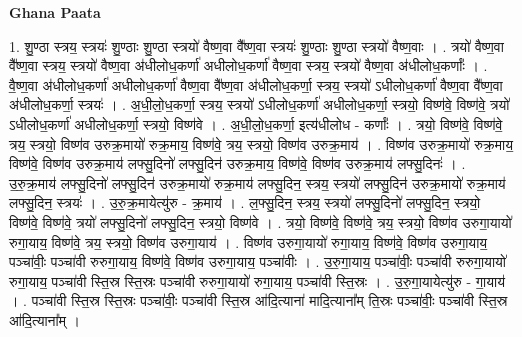 \documentclass[17pt]{extarticle}
\begin{document}
\textbf{Ghana Paata } \newline

1. शु॒ण्ठा स्त्रय॒ स्त्रयः॑ शु॒ण्ठाः शु॒ण्ठा स्त्रयो॑ वैष्ण॒वा वै᳚ष्ण॒वा स्त्रयः॑ शु॒ण्ठाः शु॒ण्ठा स्त्रयो॑ वैष्ण॒वाः । . त्रयो॑ वैष्ण॒वा वै᳚ष्ण॒वा स्त्रय॒ स्त्रयो॑ वैष्ण॒वा अ॑धीलोध॒कर्णा॑ अधीलोध॒कर्णा॑ वैष्ण॒वा स्त्रय॒ स्त्रयो॑ वैष्ण॒वा अ॑धीलोध॒कर्णाः᳚ । . वै॒ष्ण॒वा अ॑धीलोध॒कर्णा॑ अधीलोध॒कर्णा॑ वैष्ण॒वा वै᳚ष्ण॒वा अ॑धीलोध॒कर्णा॒ स्त्रय॒ स्त्रयो॑ ऽधीलोध॒कर्णा॑ वैष्ण॒वा वै᳚ष्ण॒वा अ॑धीलोध॒कर्णा॒ स्त्रयः॑ । . अ॒धी॒लो॒ध॒कर्णा॒ स्त्रय॒ स्त्रयो॑ ऽधीलोध॒कर्णा॑ अधीलोध॒कर्णा॒ स्त्रयो॒ विष्ण॑वे॒ विष्ण॑वे॒ त्रयो॑ ऽधीलोध॒कर्णा॑ अधीलोध॒कर्णा॒ स्त्रयो॒ विष्ण॑वे । . अ॒धी॒लो॒ध॒कर्णा॒ इत्य॑धीलोध - कर्णाः᳚ । . त्रयो॒ विष्ण॑वे॒ विष्ण॑वे॒ त्रय॒ स्त्रयो॒ विष्ण॑व उरुक्र॒मायो॑ रुक्र॒माय॒ विष्ण॑वे॒ त्रय॒ स्त्रयो॒ विष्ण॑व उरुक्र॒माय॑ । . विष्ण॑व उरुक्र॒मायो॑ रुक्र॒माय॒ विष्ण॑वे॒ विष्ण॑व उरुक्र॒माय॑ लफ्सु॒दिनो॑ लफ्सु॒दिन॑ उरुक्र॒माय॒ विष्ण॑वे॒ विष्ण॑व उरुक्र॒माय॑ लफ्सु॒दिनः॑ । . उ॒रु॒क्र॒माय॑ लफ्सु॒दिनो॑ लफ्सु॒दिन॑ उरुक्र॒मायो॑ रुक्र॒माय॑ लफ्सु॒दिन॒ स्त्रय॒ स्त्रयो॑ लफ्सु॒दिन॑ उरुक्र॒मायो॑ रुक्र॒माय॑ लफ्सु॒दिन॒ स्त्रयः॑ । . उ॒रु॒क्र॒मायेत्यु॑रु - क्र॒माय॑ । . ल॒फ्सु॒दिन॒ स्त्रय॒ स्त्रयो॑ लफ्सु॒दिनो॑ लफ्सु॒दिन॒ स्त्रयो॒ विष्ण॑वे॒ विष्ण॑वे॒ त्रयो॑ लफ्सु॒दिनो॑ लफ्सु॒दिन॒ स्त्रयो॒ विष्ण॑वे । . त्रयो॒ विष्ण॑वे॒ विष्ण॑वे॒ त्रय॒ स्त्रयो॒ विष्ण॑व उरुगा॒यायो॑ रुगा॒याय॒ विष्ण॑वे॒ त्रय॒ स्त्रयो॒ विष्ण॑व उरुगा॒याय॑ । . विष्ण॑व उरुगा॒यायो॑ रुगा॒याय॒ विष्ण॑वे॒ विष्ण॑व उरुगा॒याय॒ पञ्चा॑वीः॒ पञ्चा॑वी रुरुगा॒याय॒ विष्ण॑वे॒ विष्ण॑व उरुगा॒याय॒ पञ्चा॑वीः । . उ॒रु॒गा॒याय॒ पञ्चा॑वीः॒ पञ्चा॑वी रुरुगा॒यायो॑ रुगा॒याय॒ पञ्चा॑वी स्ति॒स्र स्ति॒स्रः पञ्चा॑वी रुरुगा॒यायो॑ रुगा॒याय॒ पञ्चा॑वी स्ति॒स्रः । . उ॒रु॒गा॒यायेत्यु॑रु - गा॒याय॑ । . पञ्चा॑वी स्ति॒स्र स्ति॒स्रः पञ्चा॑वीः॒ पञ्चा॑वी स्ति॒स्र आ॑दि॒त्याना॑ मादि॒त्याना᳚म् ति॒स्रः पञ्चा॑वीः॒ पञ्चा॑वी स्ति॒स्र आ॑दि॒त्याना᳚म् । \newline
\end{document}
